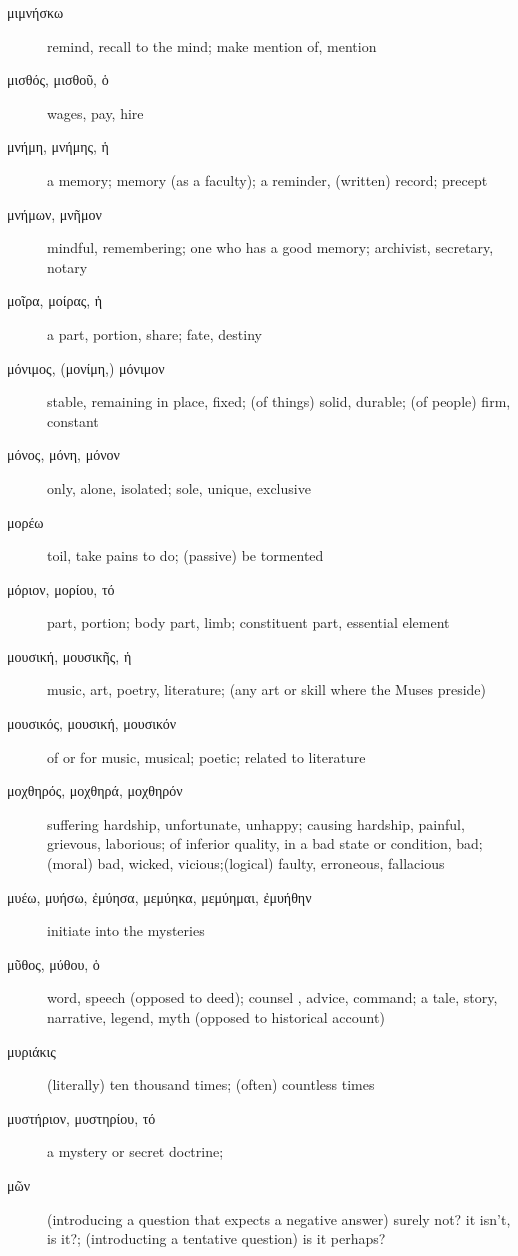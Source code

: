 \documentclass[12pt,letterpaper]{article}
\begin{document}
\begin{description}
    \item[\textgreek{μιμνήσκω}] remind, recall to the mind; make mention of, mention
    \item[\textgreek{μισθός, μισθοῦ, ὁ}] wages, pay, hire
    \item[\textgreek{μνήμη, μνήμης, ἡ}] a memory; memory (as a faculty); a reminder, (written) record; precept
    \item[\textgreek{μνήμων, μνῆμον}] mindful, remembering; one who has a good memory; archivist, secretary, notary
    \item[\textgreek{μοῖρα, μοίρας, ἡ}] a part, portion, share; fate, destiny
    \item[\textgreek{μόνιμος, (μονίμη,) μόνιμον}] stable, remaining in place, fixed; (of things) solid, durable; (of people) firm, constant
    \item[\textgreek{μόνος, μόνη, μόνον}] \marginnote{*}only, alone, isolated; sole, unique, exclusive
    \item[\textgreek{μορέω}] toil, take pains to do; (passive) be tormented
    \item[\textgreek{μόριον, μορίου, τό}] part, portion; body part, limb; constituent part, essential element
    \item[\textgreek{μουσική, μουσικῆς, ἡ}] music, art, poetry, literature; (any art or skill where the Muses preside)
    \item[\textgreek{μουσικός, μουσική, μουσικόν}] of or for music, musical; poetic; related to literature
    \item[\textgreek{μοχθηρός, μοχθηρά, μοχθηρόν}] suffering hardship, unfortunate, unhappy; causing hardship, painful, grievous, laborious; of inferior quality, in a bad state or condition, bad;  (moral) bad, wicked, vicious;(logical) faulty, erroneous, fallacious
    \item[\textgreek{μυέω, μυήσω, ἐμύησα, μεμύηκα, μεμύημαι, ἐμυήθην}] initiate into the mysteries
    \item[\textgreek{μῦθος, μύθου, ὁ}] word, speech (opposed to deed); counsel , advice, command; a tale, story, narrative, legend, myth (opposed to historical account)
    \item[\textgreek{μυριάκις}] (literally) ten thousand times; (often) countless times
    \item[\textgreek{μυστήριον, μυστηρίου, τό}] a mystery or secret doctrine;
    \item[\textgreek{μῶν}] (introducing a question that expects a negative answer) surely not? it isn't, is it?; (introducting a tentative question) is it perhaps?

\end{description}
\end{document}
